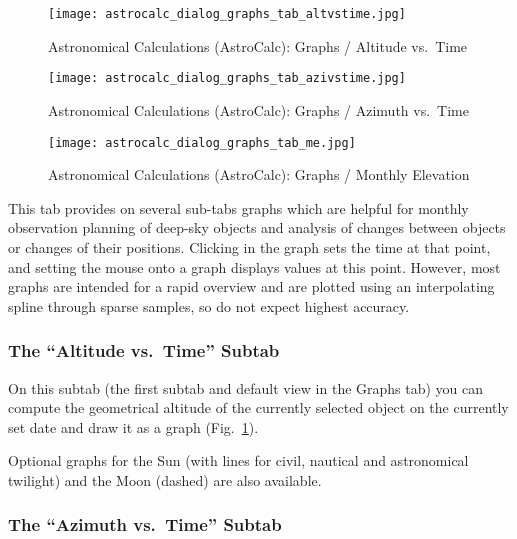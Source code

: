 \begin{figure}[p]
\centering\texttt{[image: astrocalc\_dialog\_graphs\_tab\_altvstime.jpg]}
\caption{Astronomical Calculations (AstroCalc): Graphs / Altitude vs.\ Time}
\label{fig:gui:AstroCalc:Graphs:AltVsTime}
\end{figure}
\begin{figure}[p]
\centering\texttt{[image: astrocalc\_dialog\_graphs\_tab\_azivstime.jpg]}
\caption{Astronomical Calculations (AstroCalc): Graphs / Azimuth vs.\ Time}
\label{fig:gui:AstroCalc:Graphs:AziVsTime}
\end{figure}

\begin{figure}[p]
\centering\texttt{[image: astrocalc\_dialog\_graphs\_tab\_me.jpg]}
\caption{Astronomical Calculations (AstroCalc): Graphs / Monthly Elevation}
\label{fig:gui:AstroCalc:Graphs:ME}
\end{figure}


This tab provides on several sub-tabs
 graphs which are helpful for monthly observation
planning of deep-sky objects and analysis of changes between objects
or changes of their positions. Clicking  in the
graph sets the time at that point, and setting the mouse onto a graph
displays values at this point. However, most graphs are intended for a
rapid overview and are plotted using an interpolating spline through sparse samples,
so do not expect highest accuracy. 

\subsubsection{The ``Altitude vs.\ Time'' Subtab}
\label{sec:gui:AstroCalc:Graphs:AltVsTime}
  
On this subtab (the first subtab and default view in the Graphs tab) you can compute the geometrical altitude of the currently selected object 
on the currently set date and draw it as a graph (Fig.~\ref{fig:gui:AstroCalc:Graphs:AltVsTime}).

Optional graphs for the Sun (with lines for civil, nautical and astronomical twilight) and the Moon (dashed) are also available.

\subsubsection{The ``Azimuth vs.\ Time'' Subtab}
\label{sec:gui:AstroCalc:Graphs:AziVsTime}
  
